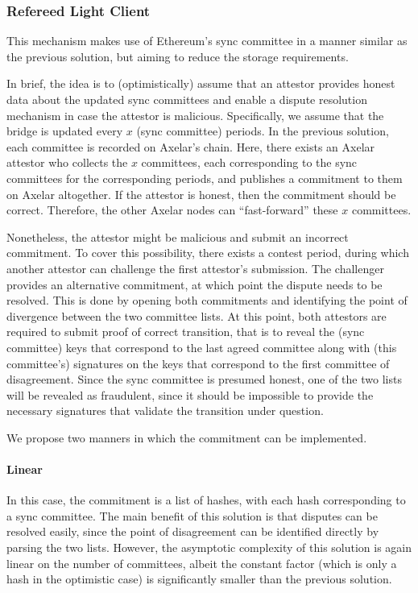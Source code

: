 \subsubsection{Refereed Light Client}

This mechanism makes use of Ethereum's sync committee in a manner similar as
the previous solution, but aiming to reduce the storage requirements. 

In brief, the idea is to (optimistically) assume that an attestor provides
honest data about the updated sync committees and enable a dispute resolution
mechanism in case the attestor is malicious. Specifically, we assume that the
bridge is updated every $x$ (sync committee) periods. In the previous
solution, each committee is recorded on Axelar's chain. Here, there exists an
Axelar attestor who collects the $x$ committees, each corresponding to the sync
committees for the corresponding periods, and publishes a commitment to them on
Axelar altogether. If the attestor is honest, then the commitment should be
correct.  Therefore, the other Axelar nodes can ``fast-forward'' these $x$
committees.

Nonetheless, the attestor might be malicious and submit an incorrect
commitment. To cover this possibility, there exists a contest period, during
which another attestor can challenge the first attestor's submission. The
challenger provides an alternative commitment, at which point the dispute needs
to be resolved. This is done by opening both commitments and identifying the
point of divergence between the two committee lists. At this point, both
attestors are required to submit proof of correct transition, that is to reveal
the (sync committee) keys that correspond to the last agreed committee along
with (this committee's) signatures on the keys that correspond to the first
committee of disagreement. Since the sync committee is presumed honest, one of
the two lists will be revealed as fraudulent, since it should be impossible to
provide the necessary signatures that validate the transition under question.

We propose two manners in which the commitment can be implemented.

\paragraph{Linear}
In this case, the commitment is a list of hashes, with each hash corresponding
to a sync committee. The main benefit of this solution is that disputes can be
resolved easily, since the point of disagreement can be identified directly by
parsing the two lists. However, the asymptotic complexity of this solution is
again linear on the number of committees, albeit the constant factor (which is
only a hash in the optimistic case) is significantly smaller than the previous
solution.

